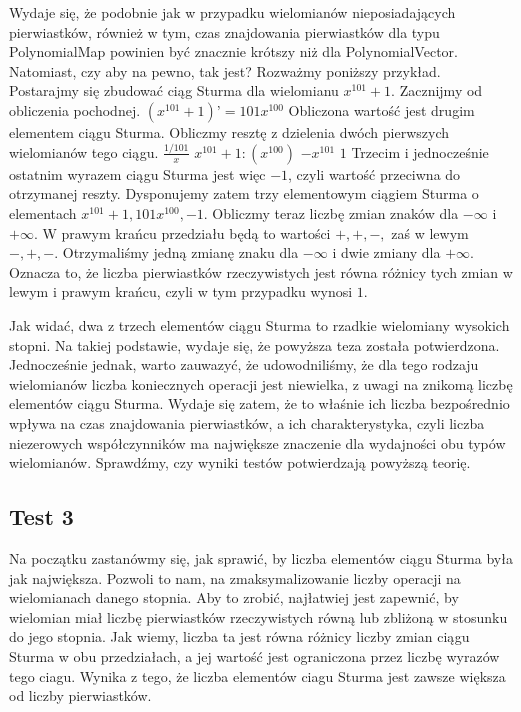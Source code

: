 \documentclass[twoside,a4paper]{book}
\begin{document}
Wydaje się, że podobnie jak w przypadku wielomianów nieposiadających pierwiastków, również w tym, czas znajdowania pierwiastków dla typu PolynomialMap powinien być znacznie krótszy niż dla PolynomialVector. Natomiast, czy aby na pewno, tak jest? Rozważmy poniższy przykład.
Postarajmy się zbudować ciąg Sturma dla wielomianu $x^{101}+1$. Zacznijmy od obliczenia pochodnej.
$(x^{101}+1)’=101x^{100}$
Obliczona wartość jest drugim elementem ciągu Sturma. Obliczmy resztę z dzielenia dwóch pierwszych wielomianów tego ciągu.
$\frac{1/101}x$
$x^{101}+1 : (x^{100})$
$-x^{101}$
$1$
Trzecim i jednocześnie ostatnim wyrazem ciągu Sturma jest więc $-1$, czyli wartość przeciwna do otrzymanej reszty. Dysponujemy zatem trzy elementowym ciągiem Sturma o elementach ${x^{101}+1, 101x^{100}, -1}$. Obliczmy teraz liczbę zmian znaków dla $-\infty$ i $+\infty$. W prawym krańcu przedziału będą to wartości $+,+,-,$ zaś w lewym $-,+,-.$ Otrzymaliśmy jedną zmianę znaku dla $-\infty$ i dwie zmiany dla $+\infty$. Oznacza to, że liczba pierwiastków rzeczywistych jest równa różnicy tych zmian w lewym i prawym krańcu, czyli w tym przypadku wynosi $1$.

Jak widać, dwa z trzech elementów ciągu Sturma to rzadkie wielomiany wysokich stopni. Na takiej podstawie, wydaje się, że powyższa teza została potwierdzona. Jednocześnie jednak, warto zauwazyć, że udowodniliśmy, że dla tego rodzaju wielomianów liczba koniecznych operacji jest niewielka, z uwagi na znikomą liczbę elementów ciągu Sturma. Wydaje się zatem, że to właśnie ich liczba bezpośrednio wpływa na czas znajdowania pierwiastków, a ich charakterystyka, czyli liczba niezerowych współczynników ma największe znaczenie dla wydajności obu typów wielomianów. Sprawdźmy, czy wyniki testów potwierdzają powyższą teorię.

\subsection{Test 3}

Na początku zastanówmy się, jak sprawić, by liczba elementów ciągu Sturma była jak największa. Pozwoli to nam, na zmaksymalizowanie liczby operacji na wielomianach danego stopnia. Aby to zrobić, najłatwiej jest zapewnić, by wielomian miał liczbę pierwiastków rzeczywistych równą lub zbliżoną w stosunku do jego stopnia. Jak wiemy, liczba ta jest równa różnicy liczby zmian ciągu Sturma w obu przedziałach, a jej wartość jest ograniczona przez liczbę wyrazów tego ciagu. Wynika z tego, że liczba elementów ciagu Sturma jest zawsze większa od liczby pierwiastków.
\end{document}
